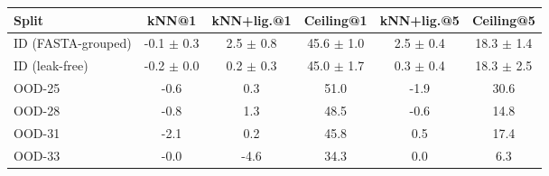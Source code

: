 \begin{tabular}{lccccc}
\toprule
Split & kNN@1 & kNN+lig.@1 & Ceiling@1 & kNN+lig.@5 & Ceiling@5 \\
\midrule
ID (FASTA-grouped) & -0.1 $\pm$ 0.3 & 2.5 $\pm$ 0.8 & 45.6 $\pm$ 1.0 & 2.5 $\pm$ 0.4 & 18.3 $\pm$ 1.4 \\
ID (leak-free) & -0.2 $\pm$ 0.0 & 0.2 $\pm$ 0.3 & 45.0 $\pm$ 1.7 & 0.3 $\pm$ 0.4 & 18.3 $\pm$ 2.5 \\
OOD-25 & -0.6 & 0.3 & 51.0 & -1.9 & 30.6 \\
OOD-28 & -0.8 & 1.3 & 48.5 & -0.6 & 14.8 \\
OOD-31 & -2.1 & 0.2 & 45.8 & 0.5 & 17.4 \\
OOD-33 & -0.0 & -4.6 & 34.3 & 0.0 & 6.3 \\
\bottomrule
\end{tabular}
